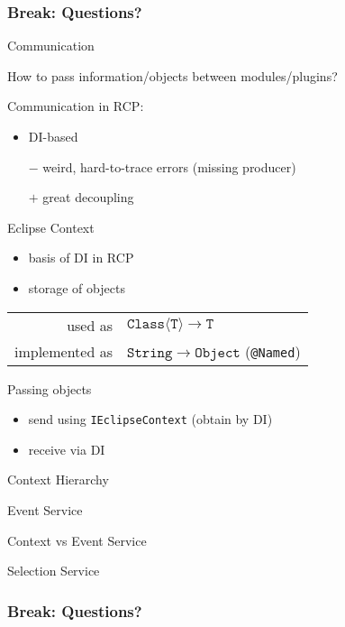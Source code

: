 \documentclass{beamer}
\newcommand{\eg}{\textcolor{pumpkin}{\raisebox{-0.5mm}{\HandRight}}}
\newcommand{\breakframe}{\begin{fillerframe}\frametitle{Break: Questions?}\end{fillerframe}}
\newenvironment{centerblock}{\begin{block}{}\begin{center}}{\end{center}\end{block}}
\begin{document}
\breakframe

\begin{frame}{Communication}%
	\begin{centerblock}How to pass information/objects between modules/plugins?\end{centerblock}

	\medskip

	Communication in RCP:
	\begin{itemize}
		\item DI-based
		\item[$-$] weird, hard-to-trace errors (missing producer)
		\item[$+$] great decoupling
	\end{itemize}
\end{frame}%
\begin{frame}{Eclipse Context}
	\begin{itemize}
		\item basis of DI in RCP
		\item storage of objects
	\end{itemize}
	\begin{centerblock}\begin{tabular}{rl}
		used as & $\mathtt{Class\langle T\rangle}\to\mathtt{T}$\\
		implemented as & $\mathtt{String} \to \mathtt{Object}$ (\texttt{@Named})\\
	\end{tabular}\end{centerblock}
	Passing objects \eg
	\begin{itemize}
		\item send using \texttt{IEclipseContext} (obtain by DI)
		\item receive via DI
	\end{itemize}
\end{frame}
\begin{frame}{Context Hierarchy}
\end{frame}
\begin{frame}{Event Service}
\end{frame}
\begin{frame}{Context \hfill vs \hfill Event Service}
\end{frame}
\begin{frame}{Selection Service}
\end{frame}

\breakframe
\end{document}
